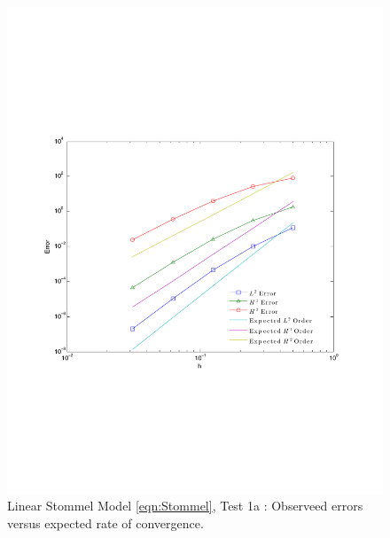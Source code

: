 \begin{figure}
  \begin{center}
    \includegraphics[scale=0.5]{figures/StommelAConvergence.pdf}
    \caption{Linear Stommel Model \eqref{eqn:Stommel}, Test 1a \cite{Vallis06}:
      Observeed errors versus expected rate of convergence.}
    \label{fig:StommelErrorsVallis}
  \end{center}
\end{figure}


